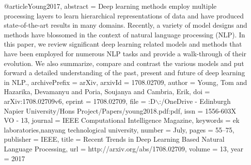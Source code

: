 @article{Young2017,
      abstract = {Deep learning methods employ multiple processing layers to learn hierarchical representations of data and have produced state-of-the-art results in many domains. Recently, a variety of model designs and methods have blossomed in the context of natural language processing (NLP). In this paper, we review significant deep learning related models and methods that have been employed for numerous NLP tasks and provide a walk-through of their evolution. We also summarize, compare and contrast the various models and put forward a detailed understanding of the past, present and future of deep learning in NLP.},
      archivePrefix = {arXiv},
      arxivId = {1708.02709},
      author = {Young, Tom and Hazarika, Devamanyu and Poria, Soujanya and Cambria, Erik},
      doi = {arXiv:1708.02709v6},
      eprint = {1708.02709},
      file = {:D$\backslash$:/OneDrive - Edinburgh Napier University/Hons Project/Papers/young2018.pdf:pdf},
      issn = {1556-603X VO  - 13},
      journal = {IEEE Computational Intelligence Magazine},
      keywords = {ek laboratories,nanyang technological university},
      number = {July},
      pages = {55--75},
      publisher = {IEEE},
      title = {{Recent Trends in Deep Learning Based Natural Language Processing}},
      url = {http://arxiv.org/abs/1708.02709},
      volume = {13},
      year = {2017}
}
